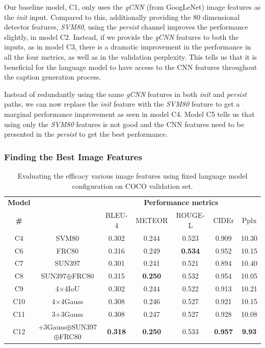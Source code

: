 Our baseline model, C1, only uses the \emph{gCNN} (from GoogLeNet) image
features as the \emph{init} input.
Compared to this, additionally providing the 80 dimensional detector features,
\emph{SVM80},
using the \emph{persist} channel improves the performance slightly, in model C2.
Instead, if we provide the \emph{gCNN} features to both the inputs, as in model C3,
there is a dramatic improvement in the performance in all the four metrics, as
well as in the validation perplexity.
This tells us that it is beneficial for the language model to have access to the
CNN features throughout the caption generation process.

Instead of redundantly using the same \emph{gCNN} features in both \emph{init} and
\emph{persist} paths, we can now replace the \emph{init} feature with the \emph{SVM80}
feature to get a marginal performance improvement as seen in model C4.
Model C5 tells us that using only the \emph{SVM80} features is not good and the CNN
features need to be presented in the \emph{persist} to get the best performance. 

\subsubsection{Finding the Best Image Features}
\begin{table}[htp]
  \centering
  \newcommand{\bs}{\small}
  \begin{adjustbox}{center}
  \begin{tabular}{|c|c|c|c|c|c|c|}
    \hline
    \bf Model & \bf \multirow{2}{*}{Init feature} & \multicolumn{5}{c|}{\bf Performance metrics}\\
    \cline{3-7}
    \bf \# &\bf &\bs BLEU-4 &\bs METEOR &\bs ROUGE-L &\bs CIDEr&\bs Pplx \\\hline
    C4 & SVM80               & 0.302 & 0.244 & 0.523 & 0.909 & 10.30  \\
    C6 & FRC80               & 0.316 & 0.249 &\bf0.534 & 0.952 & 10.15  \\
    C7 & SUN397              & 0.301 & 0.241 & 0.521 & 0.894 & 10.40  \\
    C8 & SUN397$\oplus$FRC80 & 0.315 &\bf0.250 & 0.532 &0.954 &10.05  \\\hline
    C9 & 4$\times$4IoU       & 0.302 & 0.244 & 0.522 & 0.913 & 10.21  \\
    C10 & 4$\times$4Gauss    & 0.308 & 0.246 & 0.527 & 0.921 & 10.15  \\
    C11 & 3+3Gauss           & 0.308 & 0.247 & 0.527 & 0.928 & 10.08  \\\hline
    C12 &\parbox[c][][c]{4cm}{\smallskip{}+3Gauss$\oplus$SUN397\\$\oplus$FRC80\smallskip} 
                             &\bf0.318&\bf0.250&0.533 &\bf0.957&\bf9.93\\\hline
  \end{tabular}
  \end{adjustbox}
  \caption{Evaluating the efficacy various image features using fixed language model
          configuration on COCO validation set.}
  \label{tab:resCocFeatExpt}
\end{table}

